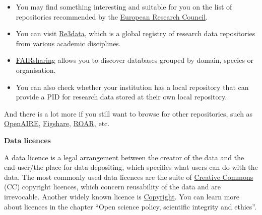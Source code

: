 \documentclass[
]{book}
\begin{document}
\begin{itemize}
\item
  You may find something interesting and suitable for you on the list of repositories recommended by the \href{https://erc.europa.eu/funding-and-grants/managing-project/open-access}{European Research Council}.
\item
  You can visit \href{https://www.re3data.org/}{Re3data}, which is a global registry of research data repositories from various academic disciplines.
\item
  \href{https://fairsharing.org/search?fairsharingRegistry=Database}{FAIRsharing} allows you to discover databases grouped by domain, species or organisation.
\item
  You can also check whether your institution has a local repository that can provide a PID for research data stored at their own local repository.
\end{itemize}

And there is a lot more if you still want to browse for other repositories, such as \href{https://explore.openaire.eu/participate/deposit/learn-how}{OpenAIRE}, \href{https://figshare.com/}{Figshare}, \href{http://roar.eprints.org/}{ROAR}, etc.

\textbf{Data licences}

A data licence is a legal arrangement between the creator of the data and the end-user/the place for data depositing, which specifies what users can do with the data. The most commonly used data licences are the suite of \href{https://en.wikipedia.org/wiki/Creative_Commons}{Creative Commons} (CC) copyright licences, which concern reusability of the data and are irrevocable. Another widely known licence is \href{https://en.wikipedia.org/wiki/Copyright}{Copyright}. You can learn more about licences in the chapter ``Open science policy, scientific integrity and ethics''.
\end{document}
